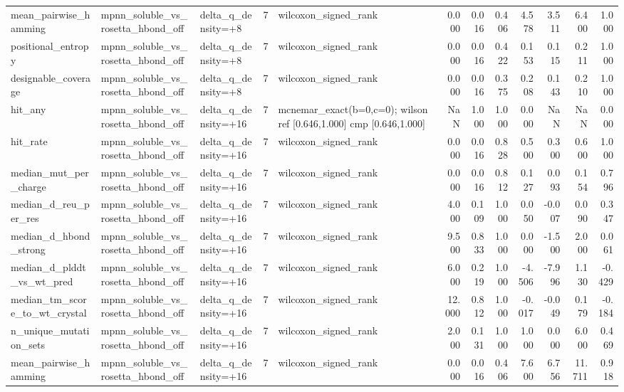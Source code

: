 \begin{table}
{\begin{tabular}{lllrlrrrrrrr}
mean\_pairwise\_hamming & mpnn\_soluble\_vs\_rosetta\_hbond\_off & delta\_q\_density=+8 & 7 & wilcoxon\_signed\_rank & 0.000 & 0.016 & 0.406 & 4.578 & 3.511 & 6.400 & 1.000 \\
positional\_entropy & mpnn\_soluble\_vs\_rosetta\_hbond\_off & delta\_q\_density=+8 & 7 & wilcoxon\_signed\_rank & 0.000 & 0.016 & 0.422 & 0.153 & 0.115 & 0.211 & 1.000 \\
designable\_coverage & mpnn\_soluble\_vs\_rosetta\_hbond\_off & delta\_q\_density=+8 & 7 & wilcoxon\_signed\_rank & 0.000 & 0.016 & 0.375 & 0.208 & 0.143 & 0.210 & 1.000 \\
hit\_any & mpnn\_soluble\_vs\_rosetta\_hbond\_off & delta\_q\_density=+16 & 7 & mcnemar\_exact(b=0,c=0); wilson ref [0.646,1.000] cmp [0.646,1.000] & NaN & 1.000 & 1.000 & 0.000 & NaN & NaN & 0.000 \\
hit\_rate & mpnn\_soluble\_vs\_rosetta\_hbond\_off & delta\_q\_density=+16 & 7 & wilcoxon\_signed\_rank & 0.000 & 0.016 & 0.828 & 0.500 & 0.300 & 0.600 & 1.000 \\
median\_mut\_per\_charge & mpnn\_soluble\_vs\_rosetta\_hbond\_off & delta\_q\_density=+16 & 7 & wilcoxon\_signed\_rank & 0.000 & 0.016 & 0.812 & 0.127 & 0.093 & 0.154 & 0.796 \\
median\_d\_reu\_per\_res & mpnn\_soluble\_vs\_rosetta\_hbond\_off & delta\_q\_density=+16 & 7 & wilcoxon\_signed\_rank & 4.000 & 0.109 & 1.000 & 0.050 & -0.007 & 0.090 & 0.347 \\
median\_d\_hbond\_strong & mpnn\_soluble\_vs\_rosetta\_hbond\_off & delta\_q\_density=+16 & 7 & wilcoxon\_signed\_rank & 9.500 & 0.833 & 1.000 & 0.000 & -1.500 & 2.000 & 0.061 \\
median\_d\_plddt\_vs\_wt\_pred & mpnn\_soluble\_vs\_rosetta\_hbond\_off & delta\_q\_density=+16 & 7 & wilcoxon\_signed\_rank & 6.000 & 0.219 & 1.000 & -4.506 & -7.996 & 1.130 & -0.429 \\
median\_tm\_score\_to\_wt\_crystal & mpnn\_soluble\_vs\_rosetta\_hbond\_off & delta\_q\_density=+16 & 7 & wilcoxon\_signed\_rank & 12.000 & 0.812 & 1.000 & -0.017 & -0.049 & 0.179 & -0.184 \\
n\_unique\_mutation\_sets & mpnn\_soluble\_vs\_rosetta\_hbond\_off & delta\_q\_density=+16 & 7 & wilcoxon\_signed\_rank & 2.000 & 0.131 & 1.000 & 1.000 & 0.000 & 6.000 & 0.469 \\
mean\_pairwise\_hamming & mpnn\_soluble\_vs\_rosetta\_hbond\_off & delta\_q\_density=+16 & 7 & wilcoxon\_signed\_rank & 0.000 & 0.016 & 0.406 & 7.600 & 6.756 & 11.711 & 0.918 \\

\end{tabular}}
\end{table}
